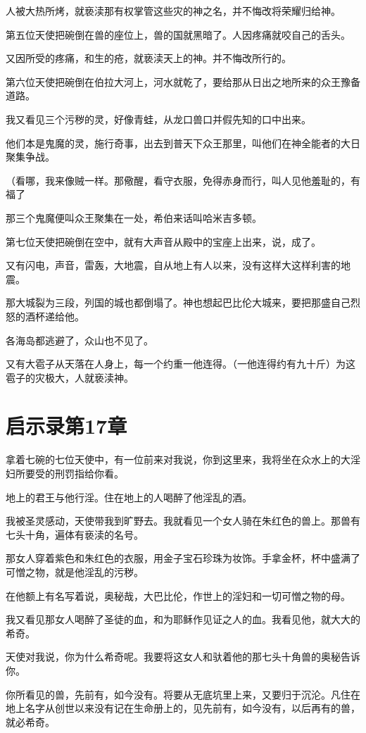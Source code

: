 \documentclass[12pt,oneside]{book}
\begin{document}
人被大热所烤，就亵渎那有权掌管这些灾的神之名，并不悔改将荣耀归给神。

第五位天使把碗倒在兽的座位上，兽的国就黑暗了。人因疼痛就咬自己的舌头。

又因所受的疼痛，和生的疮，就亵渎天上的神。并不悔改所行的。

第六位天使把碗倒在伯拉大河上，河水就乾了，要给那从日出之地所来的众王豫备道路。

我又看见三个污秽的灵，好像青蛙，从龙口兽口并假先知的口中出来。

他们本是鬼魔的灵，施行奇事，出去到普天下众王那里，叫他们在神全能者的大日聚集争战。

（看哪，我来像贼一样。那儆醒，看守衣服，免得赤身而行，叫人见他羞耻的，有福了

那三个鬼魔便叫众王聚集在一处，希伯来话叫哈米吉多顿。

第七位天使把碗倒在空中，就有大声音从殿中的宝座上出来，说，成了。

又有闪电，声音，雷轰，大地震，自从地上有人以来，没有这样大这样利害的地震。

那大城裂为三段，列国的城也都倒塌了。神也想起巴比伦大城来，要把那盛自己烈怒的酒杯递给他。

各海岛都逃避了，众山也不见了。

又有大雹子从天落在人身上，每一个约重一他连得。（一他连得约有九十斤）为这雹子的灾极大，人就亵渎神。

\chapter{启示录第17章}
拿着七碗的七位天使中，有一位前来对我说，你到这里来，我将坐在众水上的大淫妇所要受的刑罚指给你看。

地上的君王与他行淫。住在地上的人喝醉了他淫乱的酒。

我被圣灵感动，天使带我到旷野去。我就看见一个女人骑在朱红色的兽上。那兽有七头十角，遍体有亵渎的名号。

那女人穿着紫色和朱红色的衣服，用金子宝石珍珠为妆饰。手拿金杯，杯中盛满了可憎之物，就是他淫乱的污秽。

在他额上有名写着说，奥秘哉，大巴比伦，作世上的淫妇和一切可憎之物的母。

我又看见那女人喝醉了圣徒的血，和为耶稣作见证之人的血。我看见他，就大大的希奇。

天使对我说，你为什么希奇呢。我要将这女人和驮着他的那七头十角兽的奥秘告诉你。

你所看见的兽，先前有，如今没有。将要从无底坑里上来，又要归于沉沦。凡住在地上名字从创世以来没有记在生命册上的，见先前有，如今没有，以后再有的兽，就必希奇。
\end{document}
